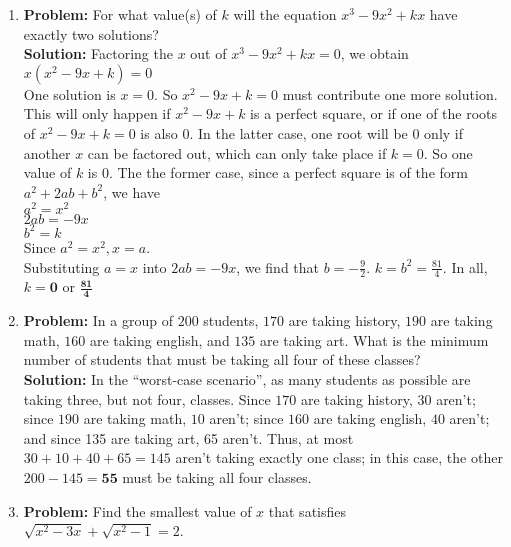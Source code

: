\documentclass{article}
\begin{document}
\begin{enumerate}
\item \textbf{Problem:} For what value(s) of $k$ will the equation $x^3 - 9x^2 + kx$ have exactly two solutions? \\

\textbf{Solution:} Factoring the $x$ out of $x^3 - 9x^2 + kx=0$, we obtain $x(x^2 - 9x + k)=0$ \\

One solution is $x=0$.  So $x^2 - 9x + k = 0$ must contribute one more solution.  This will only happen if $x^2 - 9x + k$ is a perfect square, or if one of the roots of $x^2 - 9x + k = 0$ is also $0$.  In the latter case, one root will be $0$ only if another $x$ can be factored out, which can only take place if $k=0$.  So one value of $k$ is $0$.  The the former case, since a perfect square is of the form $a^2 + 2ab + b^2$, we have \\

$a^2 = x^2$ \\
$2ab = -9x$ \\
$b^2 = k$ \\

Since $a^2 = x^2, x = a$.  \\
Substituting $a = x$ into $2ab = -9x$, we find that $b = -\frac{9}{2}$.  $k = b^2 = \frac{81}{4}$.  In all, $k = \mathbf{0}$ or $\displaystyle \mathbf{\frac{81}{4}}$

\item \textbf{Problem:} In a group of $200$ students, $170$ are taking history, $190$ are taking math, $160$ are taking english, and $135$ are taking art.  What is the minimum number of students that must be taking all four of these classes? \\

\textbf{Solution:} In the ``worst-case scenario'', as many students as possible are taking three, but not four, classes.  Since $170$ are taking history, $30$ aren't; since $190$ are taking math, $10$ aren't; since $160$ are taking english, $40$ aren't; and since 135 are taking art, 65 aren't.  Thus, at most $30 + 10 + 40 + 65 = 145$ aren't taking exactly one class; in this case, the other $200 - 145 = \mathbf{55}$ must be taking all four classes.

\item \textbf{Problem:} Find the smallest value of $x$ that satisfies $\sqrt{x^2 - 3x} + \sqrt{x^2 - 1} = 2$. \\


\end{enumerate}
\end{document}
